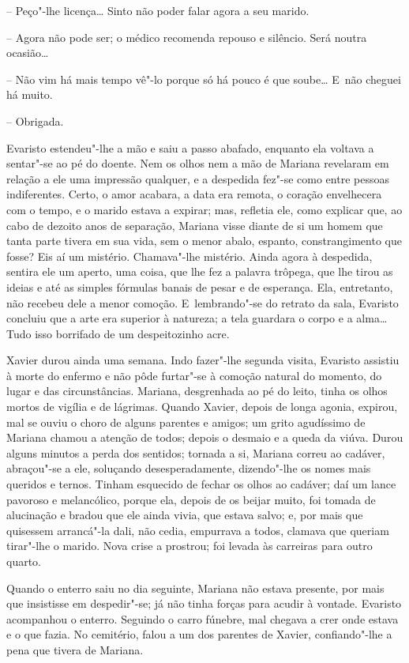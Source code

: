 -- Peço"-lhe licença\ldots{} Sinto não poder falar agora a seu marido.

-- Agora não pode ser; o médico recomenda repouso e silêncio. Será
noutra ocasião\ldots{}

-- Não vim há mais tempo vê"-lo porque só há pouco é que soube\ldots{} E~não
cheguei há muito.

-- Obrigada.

Evaristo estendeu"-lhe a mão e saiu a passo abafado, enquanto ela voltava
a sentar"-se ao pé do doente. Nem os olhos nem a mão de Mariana revelaram
em relação a ele uma impressão qualquer, e a despedida fez"-se como entre
pessoas indiferentes. Certo, o amor acabara, a data era remota, o
coração envelhecera com o tempo, e o marido estava a expirar; mas,
refletia ele, como explicar que, ao cabo de dezoito anos de separação,
Mariana visse diante de si um homem que tanta parte tivera em sua vida,
sem o menor abalo, espanto, constrangimento que fosse? Eis aí um
mistério. Chamava"-lhe mistério. Ainda agora à despedida, sentira ele um
aperto, uma coisa, que lhe fez a palavra trôpega, que lhe tirou as
ideias e até as simples fórmulas banais de pesar e de esperança. Ela,
entretanto, não recebeu dele a menor comoção. E~lembrando"-se do retrato
da sala, Evaristo concluiu que a arte era superior à natureza; a tela
guardara o corpo e a alma\ldots{} Tudo isso borrifado de um despeitozinho
acre.

Xavier durou ainda uma semana. Indo fazer"-lhe segunda visita, Evaristo
assistiu à morte do enfermo e não pôde furtar"-se à comoção natural do
momento, do lugar e das circunstâncias. Mariana, desgrenhada ao pé do
leito, tinha os olhos mortos de vigília e de lágrimas. Quando Xavier,
depois de longa agonia, expirou, mal se ouviu o choro de alguns parentes
e amigos; um grito agudíssimo de Mariana chamou a atenção de todos;
depois o desmaio e a queda da viúva. Durou alguns minutos a perda dos
sentidos; tornada a si, Mariana correu ao cadáver, abraçou"-se a ele,
soluçando desesperadamente, dizendo"-lhe os nomes mais queridos e ternos.
Tinham esquecido de fechar os olhos ao cadáver; daí um lance pavoroso e
melancólico, porque ela, depois de os beijar muito, foi tomada de
alucinação e bradou que ele ainda vivia, que estava salvo; e, por mais
que quisessem arrancá"-la dali, não cedia, empurrava a todos, clamava que
queriam tirar"-lhe o marido. Nova crise a prostrou; foi levada às
carreiras para outro quarto.

Quando o enterro saiu no dia seguinte, Mariana não estava presente, por
mais que insistisse em despedir"-se; já não tinha forças para acudir à
vontade. Evaristo acompanhou o enterro. Seguindo o carro fúnebre, mal
chegava a crer onde estava e o que fazia. No cemitério, falou a um dos
parentes de Xavier, confiando"-lhe a pena que tivera de Mariana.


